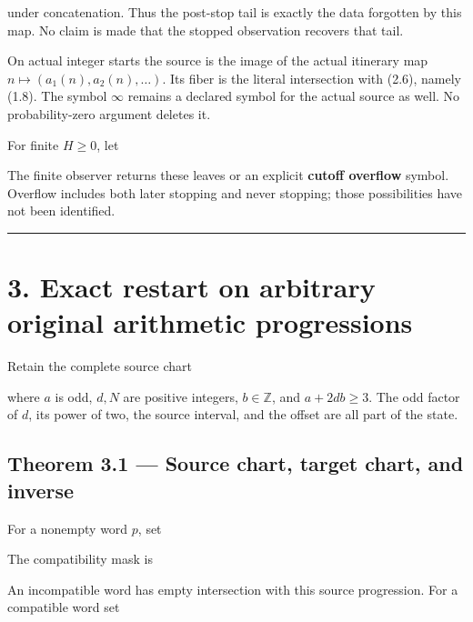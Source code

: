 
under concatenation. Thus the post-stop tail is exactly the data
forgotten by this map. No claim is made that the stopped observation
recovers that tail.

On actual integer starts the source is the image of the actual itinerary
map \(n\mapsto(a_1(n),a_2(n),\ldots)\). Its fiber is the literal
intersection with (2.6), namely (1.8). The symbol \(\infty\) remains a
declared symbol for the actual source as well. No probability-zero
argument deletes it.

For finite \(H\ge0\), let


The finite observer returns these leaves or an explicit \textbf{cutoff
overflow} symbol. Overflow includes both later stopping and never
stopping; those possibilities have not been identified.

\begin{center}\rule{0.5\linewidth}{0.5pt}\end{center}

\section{3. Exact restart on arbitrary original arithmetic progressions}

Retain the complete source chart


where \(a\) is odd, \(d,N\) are positive integers, \(b\in\mathbb Z\),
and \(a+2db\ge3\). The odd factor of \(d\), its power of two, the source
interval, and the offset are all part of the state.

\subsection{Theorem 3.1 --- Source chart, target chart, and inverse}

For a nonempty word \(p\), set


The compatibility mask is


An incompatible word has empty intersection with this source
progression. For a compatible word set

